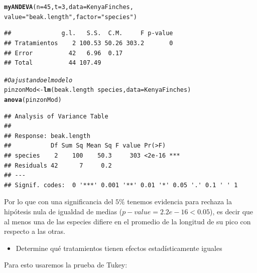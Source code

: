 \documentclass[a4paper]{scrartcl}\usepackage[]{graphicx}\usepackage[]{color}
\makeatletter
\newcommand{\hlnum}[1]{\textcolor[rgb]{0.686,0.059,0.569}{#1}}%
\newcommand{\hlstr}[1]{\textcolor[rgb]{0.192,0.494,0.8}{#1}}%
\newcommand{\hlcom}[1]{\textcolor[rgb]{0.678,0.584,0.686}{\textit{#1}}}%
\newcommand{\hlopt}[1]{\textcolor[rgb]{0,0,0}{#1}}%
\newcommand{\hlstd}[1]{\textcolor[rgb]{0.345,0.345,0.345}{#1}}%
\newcommand{\hlkwb}[1]{\textcolor[rgb]{0.69,0.353,0.396}{#1}}%
\newcommand{\hlkwc}[1]{\textcolor[rgb]{0.333,0.667,0.333}{#1}}%
\newcommand{\hlkwd}[1]{\textcolor[rgb]{0.737,0.353,0.396}{\textbf{#1}}}%
\newenvironment{kframe}{%
 \def\at@end@of@kframe{}%
 \ifinner\ifhmode%
  \def\at@end@of@kframe{\end{minipage}}%
  \begin{minipage}{\columnwidth}%
 \fi\fi%
 \def\FrameCommand##1{\hskip\@totalleftmargin \hskip-\fboxsep
 \colorbox{shadecolor}{##1}\hskip-\fboxsep
     \hskip-\linewidth \hskip-\@totalleftmargin \hskip\columnwidth}%
 \MakeFramed {\advance\hsize-\width
   \@totalleftmargin\z@ \linewidth\hsize
   \@setminipage}}%
 {\par\unskip\endMakeFramed%
 \at@end@of@kframe}
\newenvironment{knitrout}{}{} %
\makeatother
\begin{document}
\begin{itemize}
\begin{itemize}
\begin{itemize}
\begin{itemize}
\begin{knitrout}
\color{fgcolor}\begin{kframe}
\begin{alltt}
\hlkwd{myANDEVA}\hlstd{(}\hlkwc{n} \hlstd{=} \hlnum{45}\hlstd{,} \hlkwc{t} \hlstd{=} \hlnum{3}\hlstd{,} \hlkwc{data} \hlstd{= KenyaFinches,}
         \hlkwc{value} \hlstd{=} \hlstr{"beak.length"}\hlstd{,} \hlkwc{factor} \hlstd{=} \hlstr{"species"}\hlstd{)}
\end{alltt}
\begin{verbatim}
##              g.l.   S.S.  C.M.     F p-value
## Tratamientos    2 100.53 50.26 303.2       0
## Error          42   6.96  0.17              
## Total          44 107.49
\end{verbatim}
\begin{alltt}
\hlcom{# O ajustando el modelo}
\hlstd{pinzonMod} \hlkwb{<-} \hlkwd{lm}\hlstd{(beak.length} \hlopt{~} \hlstd{species,} \hlkwc{data} \hlstd{= KenyaFinches)}
\hlkwd{anova}\hlstd{(pinzonMod)}
\end{alltt}
\begin{verbatim}
## Analysis of Variance Table
## 
## Response: beak.length
##           Df Sum Sq Mean Sq F value Pr(>F)    
## species    2    100    50.3     303 <2e-16 ***
## Residuals 42      7     0.2                   
## ---
## Signif. codes:  0 '***' 0.001 '**' 0.01 '*' 0.05 '.' 0.1 ' ' 1
\end{verbatim}
\end{kframe}
\end{knitrout}

\noindent Por lo que con una significancia del $5\%$ tenemos evidencia para rechaza la hipótesis nula de igualdad de medias ($p-value = 2.2e-16 < 0.05$), es decir que al menos una de las especies difiere en el promedio de la longitud de su pico con respecto a las otras.

\begin{itemize}
  \item Determine qué tratamientos tienen efectos estadísticamente iguales
\end{itemize}

\noindent Para esto usaremos la prueba de Tukey:


\end{itemize}
\end{itemize}
\end{itemize}
\end{itemize}
\end{document}
